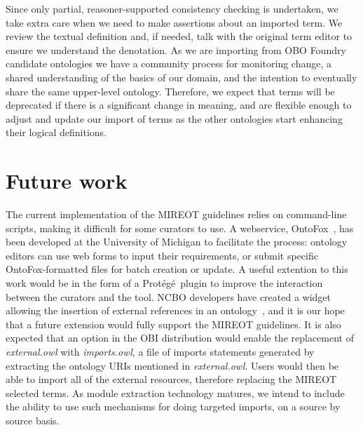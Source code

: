\documentclass[jou]{ao2e}%
\newcommand{\protege}{Prot\'{e}g\'{e}}
\begin{document}
Since only partial, reasoner-supported consistency checking is undertaken, we take extra care when we need to make assertions about an imported term. %
We review the textual definition and, if needed, talk with the original term editor to ensure we understand the denotation.
As we are importing from \ac{OBO} Foundry candidate ontologies we have a community process for monitoring change, a shared understanding of the basics of our domain, and the intention to eventually share the same upper-level ontology. 
Therefore, we expect that terms will be deprecated if there is a significant change in meaning, and are flexible enough to adjust and update our import of terms as the other ontologies start enhancing their logical definitions.

\section*{Future work}
The current implementation of the \ac{MIREOT} guidelines relies on command-line scripts, making it difficult for some curators to use. 
A webservice, OntoFox~\citep{OntoFox}, has been developed at the University of Michigan to facilitate the process: ontology editors can use web forms to input their requirements, or submit specific OntoFox-formatted files for batch creation or update.
A useful extention to this work would be in the form of a \protege\  plugin to improve the interaction between the curators and the tool. NCBO developers have created a widget allowing the insertion of external references in an ontology~\citep{NCBOWidget}, and it is our hope that a future extension would fully support the MIREOT guidelines.
It is also expected that an option in the \ac{OBI} distribution would enable the replacement of \emph{external.owl} with \emph{imports.owl}, a file of imports statements generated by extracting the ontology URIs mentioned in \emph{external.owl}. Users would then be able to import all of the external resources, therefore replacing the MIREOT selected terms.  As module extraction technology matures, we intend to include the ability to use such mechanisms for doing targeted imports, on a source by source basis.%
\end{document}
